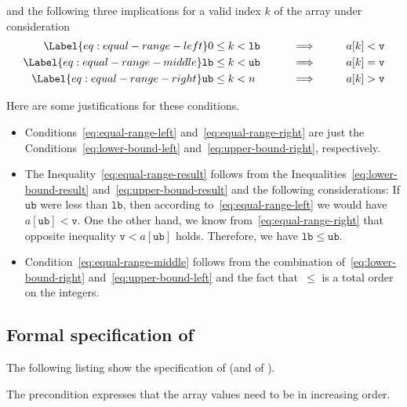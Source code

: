 and the following three implications for a valid index $k$ of the array under
consideration
%
\begin{alignat}{3}
\Label{eq:equal-range-left}
0           &\leq  k < \mathtt{lb} && \qquad\Longrightarrow\qquad &&  a[k] < \mathtt{v} \\
\Label{eq:equal-range-middle}
\mathtt{lb} &\leq k < \mathtt{ub} && \qquad\Longrightarrow\qquad &&  a[k] = \mathtt{v} \\
\Label{eq:equal-range-right}
\mathtt{ub} &\leq k < n           && \qquad\Longrightarrow\qquad &&  a[k] > \mathtt{v} 
\end{alignat}


Here are some justifications for these conditions.

\begin{itemize}
\item 
Conditions~\eqref{eq:equal-range-left} and~\eqref{eq:equal-range-right} are just the 
Conditions~\eqref{eq:lower-bound-left} and~\eqref{eq:upper-bound-right}, respectively.

\item
The Inequality~\eqref{eq:equal-range-result} follows from the Inequalities~\eqref{eq:lower-bound-result}
and~\eqref{eq:upper-bound-result} and the following considerations:
If $\mathtt{ub}$ were less than $\mathtt{lb}$, then according to~\eqref{eq:equal-range-left}
we would have $a[\mathtt{ub}] < \mathtt{v}$.
One the other hand, we know from~\eqref{eq:equal-range-right} that opposite
inequality $\mathtt{v} < a[\mathtt{ub}]$ holds.
Therefore, we have $\mathtt{lb} \leq \mathtt{ub}$.

\item
Condition~\eqref{eq:equal-range-middle} follows from the combination of~\eqref{eq:lower-bound-right}
and~\eqref{eq:upper-bound-left} and the fact that~$\leq$ is a total order on the integers.
\end{itemize}


\subsection{Formal specification of \equalrange}

The following listing show the specification of 
(and of \equalrangeii).



The precondition  expresses
that the array values need to be in increasing order.

